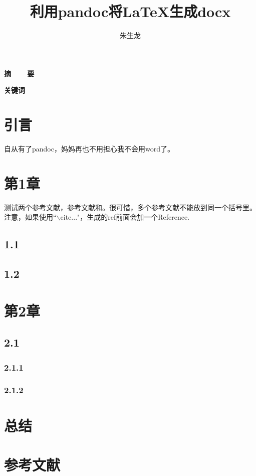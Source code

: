 \documentclass[UTF8]{ctexart}
\title{利用pandoc将\LaTeX 生成docx}
\author {朱生龙}
\newcommand{\blank}{\ \ \ \  }
\begin{document}
\maketitle

\textbf{摘\blank 要}

\textbf{关键词}

\section{引言}
自从有了pandoc，妈妈再也不用担心我不会用word了。

\section{第1章}

测试两个参考文献，参考文献\citep{Ruppert95adelaunay}和\citep{chew1989guaranteed, chew1993guaranteed}。很可惜，多个参考文献不能放到同一个括号里。注意，如果使用``$\backslash$cite{...}"，生成的ref前面会加一个Reference.

\subsection{1.1}
\subsection{1.2}

\section{第2章}
\subsection{2.1}
\subsubsection{2.1.1}
\subsubsection{2.1.2}

\section{总结}

\section{参考文献}


\end{document}
